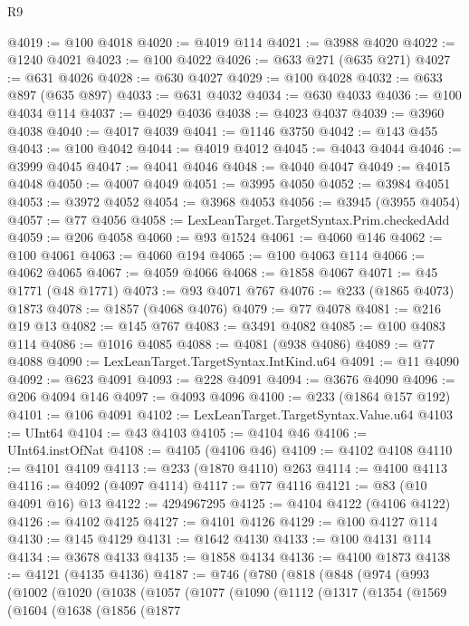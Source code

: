 \begin{lexlean}{R9}
\begin{coremodule}
{{{{{{{{{{{{{{{{{{{{{{{{{{{{{{{{{{{{{{{{{{{{{{{{{{{{{{{{{{{{{{{{{{{{{{{{{{{{{{{{{{{{{{{{{{{{{{{{{{{{{{{{{{{{@4019 := @100 @4018
@4020 := @4019 @114
@4021 := @3988 @4020
@4022 := @1240 @4021
@4023 := @100 @4022
@4026 := @633 @271 (@635 @271)
@4027 := @631 @4026
@4028 := @630 @4027
@4029 := @100 @4028
@4032 := @633 @897 (@635 @897)
@4033 := @631 @4032
@4034 := @630 @4033
@4036 := @100 @4034 @114
@4037 := @4029 @4036
@4038 := @4023 @4037
@4039 := @3960 @4038
@4040 := @4017 @4039
@4041 := @1146 @3750
@4042 := @143 @455
@4043 := @100 @4042
@4044 := @4019 @4012
@4045 := @4043 @4044
@4046 := @3999 @4045
@4047 := @4041 @4046
@4048 := @4040 @4047
@4049 := @4015 @4048
@4050 := @4007 @4049
@4051 := @3995 @4050
@4052 := @3984 @4051
@4053 := @3972 @4052
@4054 := @3968 @4053
@4056 := @3945 (@3955 @4054)
@4057 := @77 @4056
@4058 := LexLeanTarget.TargetSyntax.Prim.checkedAdd
@4059 := @206 @4058
@4060 := @93 @1524
@4061 := @4060 @146
@4062 := @100 @4061
@4063 := @4060 @194
@4065 := @100 @4063 @114
@4066 := @4062 @4065
@4067 := @4059 @4066
@4068 := @1858 @4067
@4071 := @45 @1771 (@48 @1771)
@4073 := @93 @4071 @767
@4076 := @233 (@1865 @4073) @1873
@4078 := @1857 (@4068 @4076)
@4079 := @77 @4078
@4081 := @216 @19 @13
@4082 := @145 @767
@4083 := @3491 @4082
@4085 := @100 @4083 @114
@4086 := @1016 @4085
@4088 := @4081 (@938 @4086)
@4089 := @77 @4088
@4090 := LexLeanTarget.TargetSyntax.IntKind.u64
@4091 := @11 @4090
@4092 := @623 @4091
@4093 := @228 @4091
@4094 := @3676 @4090
@4096 := @206 @4094 @146
@4097 := @4093 @4096
@4100 := @233 (@1864 @157 @192)
@4101 := @106 @4091
@4102 := LexLeanTarget.TargetSyntax.Value.u64
@4103 := UInt64
@4104 := @43 @4103
@4105 := @4104 @46
@4106 := UInt64.instOfNat
@4108 := @4105 (@4106 @46)
@4109 := @4102 @4108
@4110 := @4101 @4109
@4113 := @233 (@1870 @4110) @263
@4114 := @4100 @4113
@4116 := @4092 (@4097 @4114)
@4117 := @77 @4116
@4121 := @83 (@10 @4091 @16) @13
@4122 := 4294967295
@4125 := @4104 @4122 (@4106 @4122)
@4126 := @4102 @4125
@4127 := @4101 @4126
@4129 := @100 @4127 @114
@4130 := @145 @4129
@4131 := @1642 @4130
@4133 := @100 @4131 @114
@4134 := @3678 @4133
@4135 := @1858 @4134
@4136 := @4100 @1873
@4138 := @4121 (@4135 @4136)
@4187 := @746
    (@780
      (@818
        (@848
          (@974
            (@993
              (@1002
                (@1020
                  (@1038
                    (@1057
                      (@1077
                        (@1090
                          (@1112
                            (@1317
                              (@1354
                                (@1569
                                  (@1604
                                    (@1638
                                      (@1856
                                        (@1877
}}}}}}}}}}}}}}}}}}}}}}}}}}}}}}}}}}}}}}}}}}}}}}}}}}}}}}}}}}}}}}}}}}}}}}}}}}}}}}}}}}}}}}}}}}}}}}}}}}}}}}}}}}}}
\end{coremodule}
\end{lexlean}
